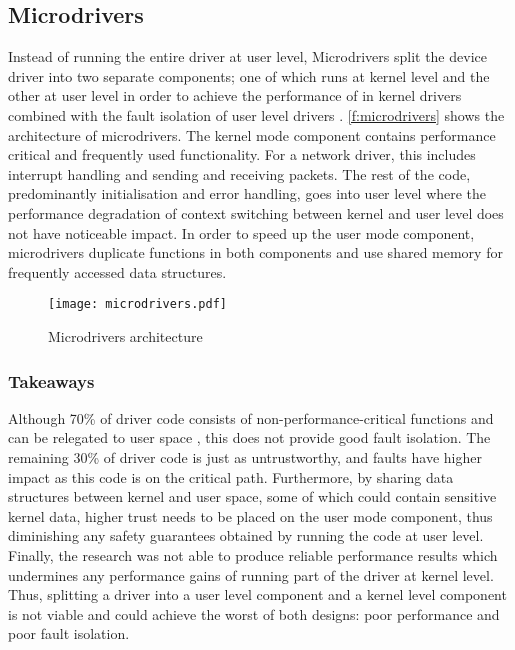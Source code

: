 \subsection{Microdrivers}
Instead of running the entire driver at user level, Microdrivers split the device driver into two separate
components; one of which runs at kernel level and the other at user level in order to achieve the performance 
of in kernel drivers combined with the fault isolation of user level drivers 
\cite{Ganapathy_RBSJ_08}. \autoref{f:microdrivers} shows the architecture of microdrivers. 
The kernel mode component contains performance critical and frequently used 
functionality. For a network driver, this includes interrupt handling and sending and 
receiving packets. The rest of the code, predominantly initialisation and error handling, goes into user level 
where the performance degradation of context switching between kernel and user level does not have noticeable
impact. In order to speed up the user mode component, microdrivers duplicate functions
in both components and use shared memory for frequently accessed data structures.

\begin{figure}[h]
  \centering
  \texttt{[image: microdrivers.pdf]}
  \caption{Microdrivers architecture}
  \label{f:microdrivers}
\end{figure}

\subsubsection{Takeaways}
Although 70\% of driver code consists of non-performance-critical functions and can be relegated to user space
\cite{Ganapathy_RBSJ_08}, this does not provide good fault isolation. The remaining 30\% of driver code is 
just as untrustworthy, and faults have higher impact as this code is on the critical path. Furthermore, by sharing
data structures between kernel and user space, some of which could contain sensitive kernel data, higher trust 
needs to be placed on the user mode component, thus diminishing any safety guarantees obtained by running the 
code at user level. Finally, the research was not able to produce reliable performance results which undermines
any performance gains of running part of the driver at kernel level. Thus, splitting a driver into a user level
component and a kernel level component is not viable and could achieve the worst of both designs: poor performance
and poor fault isolation.


